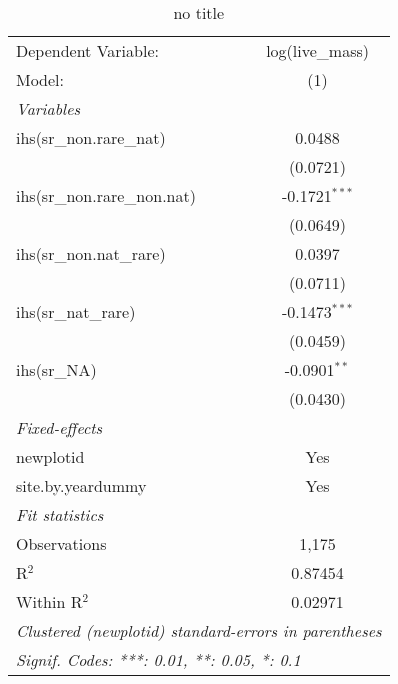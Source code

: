 
\begin{table}[htbp]
   \caption{no title}
   \centering
   \begin{tabular}{lc}
      \tabularnewline \midrule \midrule
      Dependent Variable:          & log(live\_mass)\\   
      Model:                       & (1)\\  
      \midrule
      \emph{Variables}\\
      ihs(sr\_non.rare\_nat)       & 0.0488\\   
                                   & (0.0721)\\   
      ihs(sr\_non.rare\_non.nat)   & -0.1721$^{***}$\\   
                                   & (0.0649)\\   
      ihs(sr\_non.nat\_rare)       & 0.0397\\   
                                   & (0.0711)\\   
      ihs(sr\_nat\_rare)           & -0.1473$^{***}$\\   
                                   & (0.0459)\\   
      ihs(sr\_NA)                  & -0.0901$^{**}$\\   
                                   & (0.0430)\\   
      \midrule
      \emph{Fixed-effects}\\
      newplotid                    & Yes\\  
      site.by.yeardummy            & Yes\\  
      \midrule
      \emph{Fit statistics}\\
      Observations                 & 1,175\\  
      R$^2$                        & 0.87454\\  
      Within R$^2$                 & 0.02971\\  
      \midrule \midrule
      \multicolumn{2}{l}{\emph{Clustered (newplotid) standard-errors in parentheses}}\\
      \multicolumn{2}{l}{\emph{Signif. Codes: ***: 0.01, **: 0.05, *: 0.1}}\\
   \end{tabular}
\end{table}


